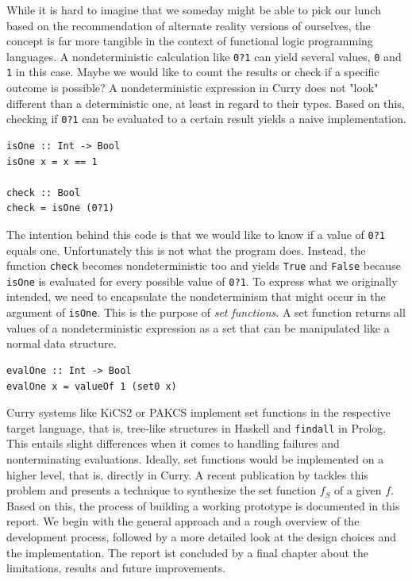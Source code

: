 \documentclass[a4paper, 11pt, fleqn]{scrreprt}
\newcommand{\cinline}[1]{\texttt{#1}}
\begin{document}
While it is hard to imagine that we someday might be able to pick our lunch based on the recommendation of alternate reality versions of ourselves, the concept is far more tangible in the context of functional logic programming languages. A nondeterministic calculation like \cinline{0?1} can yield several values, \cinline{0} and \cinline{1} in this case. Maybe we would like to count the results or check if a specific outcome is possible? A nondeterministic expression in Curry does not "look" different than a deterministic one, at least in regard to their types. Based on this, checking if \cinline{0?1} can be evaluated to a certain result yields a naive implementation.
\begin{verbatim}
isOne :: Int -> Bool
isOne x = x == 1

check :: Bool
check = isOne (0?1)
\end{verbatim}
The intention behind this code is that we would like to know if a value of \cinline{0?1} equals one. Unfortunately this is not what the program does. Instead, the function \cinline{check} becomes nondeterministic too and yields \cinline{True} and \cinline{False} because \cinline{isOne} is evaluated for every possible value of \cinline{0?1}. To express what we originally intended, we need to encapsulate the nondeterminism that might occur in the argument of \cinline{isOne}. This is the purpose of \textit{set functions}. A set function returns all values of a nondeterministic expression as a set that can be manipulated like a normal data structure.

\begin{verbatim}
evalOne :: Int -> Bool
evalOne x = valueOf 1 (set0 x)
\end{verbatim}

Curry systems like KiCS2 or PAKCS implement set functions in the respective target language, that is, tree-like structures in Haskell and \cinline{findall} in Prolog. This entails slight differences when it comes to handling failures and nonterminating evaluations. Ideally, set functions would be implemented on a higher level, that is, directly in Curry. A recent publication by \citet{synsf} tackles this problem and presents a technique to synthesize the set function $f_S$ of a given $f$. Based on this, the process of building a working prototype is documented in this report. We begin with the general approach and a rough overview of the development process, followed by a more detailed look at the design choices and the implementation. The report ist concluded by a final chapter about the limitations, results and future improvements.
\end{document}
